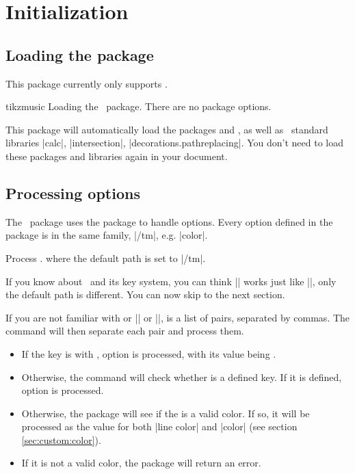 \section{Initialization}\label{sec:init}
\subsection{Loading the package}\label{sec:init:load}
This package currently only supports \LaTeXe.

\begin{package}{tikzmusic}
  Loading the \tmname\ package. There are no package options.
\end{package}

This package will automatically load the packages  
and \tikzname, as well as \tikzname\ standard libraries |calc|, 
|intersection|, |decorations.pathreplacing|. You don't need to load these 
packages and libraries again in your document.
\subsection{Processing options}\label{sec:init:options}
The \tmname\ package uses the  package to handle options. Every 
option defined in the package is in the same family, |/tm|, e.g. 
|color|.

\begin{command}{\tmset{}}
  Process . where the default path is set to |/tm|.
\end{command}

If you know about \tikzname\ and its key system, you can think |\tmset| 
works just like |\tikzset|, only the default path is different. You can now skip 
to the next section.

If you are not familiar with  or |\pgfkeys| or 
|\tikzset|,  is a list of  
pairs, separated by commas. The command will then separate each pair and process 
them.

\begin{itemize}
  \item If the key is with , option 
  is processed, with its value being .
  \item Otherwise, the command will check whether  is a defined key. 
  If it is defined, option  is processed.
  \item Otherwise, the package will see if the  is a valid color. If 
  so, it will be processed as the value for both |line color| and |color| 
  (see section \ref{sec:custom:color}).
  \item If it is not a valid color, the package will return an error.
\end{itemize}


